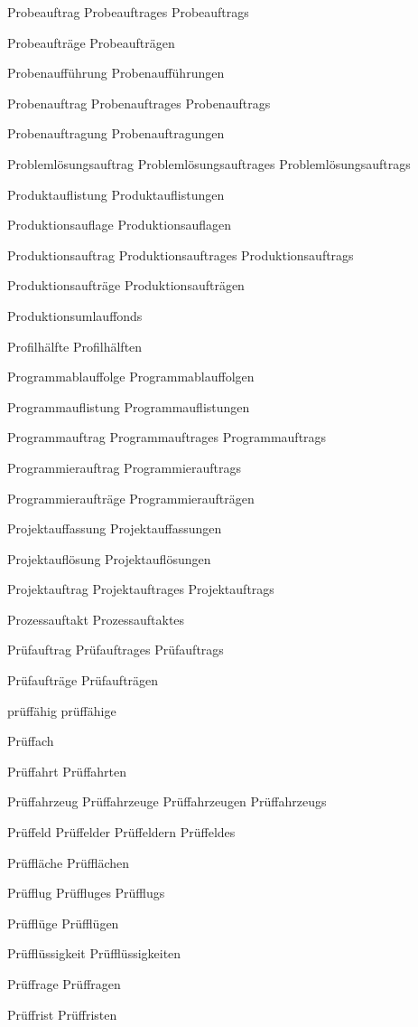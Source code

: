 Probeauftrag
Probeauftrages
Probeauftrags

Probeaufträge
Probeaufträgen

Probenaufführung
Probenaufführungen

Probenauftrag
Probenauftrages
Probenauftrags

Probenauftragung
Probenauftragungen

Problemlösungsauftrag
Problemlösungsauftrages
Problemlösungsauftrags

Produktauflistung
Produktauflistungen

Produktionsauflage
Produktionsauflagen

Produktionsauftrag
Produktionsauftrages
Produktionsauftrags

Produktionsaufträge
Produktionsaufträgen

Produktionsumlauffonds

Profilhälfte
Profilhälften

Programmablauffolge
Programmablauffolgen

Programmauflistung
Programmauflistungen

Programmauftrag
Programmauftrages
Programmauftrags

Programmierauftrag
Programmierauftrags

Programmieraufträge
Programmieraufträgen

Projektauffassung
Projektauffassungen

Projektauflösung
Projektauflösungen

Projektauftrag
Projektauftrages
Projektauftrags

Prozessauftakt
Prozessauftaktes

Prüfauftrag
Prüfauftrages
Prüfauftrags

Prüfaufträge
Prüfaufträgen

prüffähig prüffähige

Prüffach 

Prüffahrt
Prüffahrten

Prüffahrzeug
Prüffahrzeuge
Prüffahrzeugen
Prüffahrzeugs

Prüffeld
Prüffelder
Prüffeldern
Prüffeldes

Prüffläche
Prüfflächen

Prüfflug
Prüffluges
Prüfflugs

Prüfflüge
Prüfflügen

Prüfflüssigkeit
Prüfflüssigkeiten

Prüffrage
Prüffragen

Prüffrist
Prüffristen

